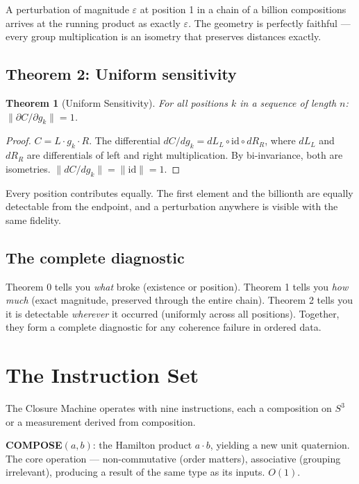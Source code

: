 \documentclass[12pt,a4paper]{article}
\newtheorem{theorem}{Theorem}
\begin{document}
A perturbation of magnitude $\varepsilon$ at position 1 in a chain of a billion compositions arrives at the running product as exactly $\varepsilon$. The geometry is perfectly faithful --- every group multiplication is an isometry that preserves distances exactly.

\subsection{Theorem 2: Uniform sensitivity}

\begin{theorem}[Uniform Sensitivity]
\label{thm:uniform}
For all positions $k$ in a sequence of length $n$: $\|\partial C / \partial g_k\| = 1$.
\end{theorem}

\begin{proof}
$C = L \cdot g_k \cdot R$. The differential $dC/dg_k = dL_L \circ \mathrm{id} \circ dR_R$, where $dL_L$ and $dR_R$ are differentials of left and right multiplication. By bi-invariance, both are isometries. $\|dC/dg_k\| = \|\mathrm{id}\| = 1$.
\end{proof}

Every position contributes equally. The first element and the billionth are equally detectable from the endpoint, and a perturbation anywhere is visible with the same fidelity.

\subsection{The complete diagnostic}

Theorem 0 tells you \emph{what} broke (existence or position). Theorem 1 tells you \emph{how much} (exact magnitude, preserved through the entire chain). Theorem 2 tells you it is detectable \emph{wherever} it occurred (uniformly across all positions). Together, they form a complete diagnostic for any coherence failure in ordered data.


\section{The Instruction Set}

The Closure Machine operates with nine instructions, each a composition on $S^3$ or a measurement derived from composition.

\textbf{COMPOSE}$(a, b)$: the Hamilton product $a \cdot b$, yielding a new unit quaternion. The core operation --- non-commutative (order matters), associative (grouping irrelevant), producing a result of the same type as its inputs. $O(1)$.
\end{document}
